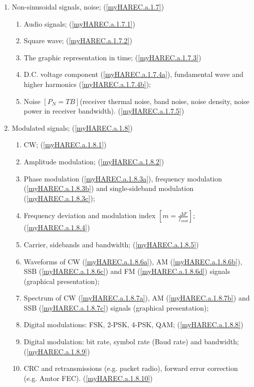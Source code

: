 \begin{enumerate}
\begin{enumerate}[noitemsep]
\item Non-sinusoidal signals, noise; (\ref{myHAREC.a.1.7})\label{HAREC.a.1.7}
\begin{enumerate}[noitemsep]
\item Audio signals; (\ref{myHAREC.a.1.7.1})\label{HAREC.a.1.7.1}
\item Square wave; (\ref{myHAREC.a.1.7.2})\label{HAREC.a.1.7.2}
\item The graphic representation in time; (\ref{myHAREC.a.1.7.3})\label{HAREC.a.1.7.3}
\item D.C. voltage component (\ref{myHAREC.a.1.7.4a})\label{HAREC.a.1.7.4a}, fundamental wave and higher harmonics (\ref{myHAREC.a.1.7.4b})\label{HAREC.a.1.7.4b};
\item Noise \(\left[P_N=TB\right]\)(receiver thermal noise, band noise, noise density, noise power in receiver bandwidth).  (\ref{myHAREC.a.1.7.5})\label{HAREC.a.1.7.5}
\end{enumerate}

\item Modulated signals; (\ref{myHAREC.a.1.8})\label{HAREC.a.1.8}
\begin{enumerate}[noitemsep]
\item CW; (\ref{myHAREC.a.1.8.1})\label{HAREC.a.1.8.1}
\item Amplitude modulation; (\ref{myHAREC.a.1.8.2})\label{HAREC.a.1.8.2}
\item Phase modulation (\ref{myHAREC.a.1.8.3a})\label{HAREC.a.1.8.3a}, frequency modulation (\ref{myHAREC.a.1.8.3b})\label{HAREC.a.1.8.3b} and single-sideband modulation (\ref{myHAREC.a.1.8.3c})\label{HAREC.a.1.8.3c};
\item Frequency deviation and modulation index \(\left[m = \frac{\Delta F}{f_{mod}}\right]\); (\ref{myHAREC.a.1.8.4})\label{HAREC.a.1.8.4}
\item Carrier, sidebands and bandwidth; (\ref{myHAREC.a.1.8.5})\label{HAREC.a.1.8.5}
\item Waveforms of CW (\ref{myHAREC.a.1.8.6a})\label{HAREC.a.1.8.6a}, AM (\ref{myHAREC.a.1.8.6b})\label{HAREC.a.1.8.6b}, SSB (\ref{myHAREC.a.1.8.6c})\label{HAREC.a.1.8.6c} and FM (\ref{myHAREC.a.1.8.6d})\label{HAREC.a.1.8.6d} signals (graphical presentation);
\item Spectrum of CW (\ref{myHAREC.a.1.8.7a})\label{HAREC.a.1.8.7a}, AM (\ref{myHAREC.a.1.8.7b})\label{HAREC.a.1.8.7b} and SSB (\ref{myHAREC.a.1.8.7c})\label{HAREC.a.1.8.7c} signals (graphical presentation);
\item Digital modulations: FSK, 2-PSK, 4-PSK, QAM; (\ref{myHAREC.a.1.8.8})\label{HAREC.a.1.8.8}
\item Digital modulation: bit rate, symbol rate (Baud rate) and bandwidth; (\ref{myHAREC.a.1.8.9})\label{HAREC.a.1.8.9}
\item CRC and retransmissions (e.g. packet radio), forward error correction (e.g. Amtor FEC). (\ref{myHAREC.a.1.8.10})\label{HAREC.a.1.8.10}
\end{enumerate}


\end{enumerate}
\end{enumerate}
